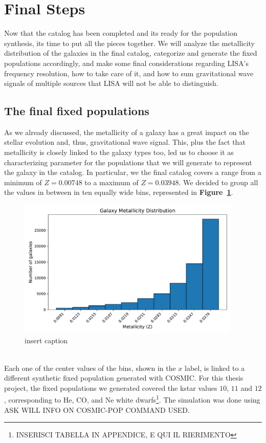 \section{Final Steps}
Now that the catalog has been completed and its ready for the population synthesis, its time to put all the pieces together.
We will analyze the metallicity distribution of the galaxies in the final catalog, categorize and generate the fixed populations accordingly, and make some final considerations regarding LISA's frequency resolution, how to take care of it, and how to sum gravitational wave signals of multiple sources that LISA will not be able to distinguish. 

\subsection{The final fixed populations}
As we already discussed, the metallicity of a galaxy has a great impact on the stellar evolution and, thus, gravitational wave signal.
This, plus the fact that metallicity is closely linked to the galaxy types too, led us to choose it as characterizing parameter for the populations that we will generate to represent the galaxy in the catalog.
In particular, we the final catalog covers a range from a minimum of $ Z= 0.00748$ to a maximum of $Z= 0.03948$.
We decided to group all the values in between in ten equally wide bins, represented in \textbf{Figure~\ref{fig: Z distribution of final catalog}}.
\begin{figure}[h!]
    \begin{center}
        \includegraphics[width=0.95\textwidth]{images/z_distro_gwgc_completed_ZOA.pdf}
    \end{center}
    \caption{insert caption}\label{fig: Z distribution of final catalog}
\end{figure}\\
Each one of the center values of the bins, shown in the $x$ label, is linked to a different synthetic fixed population generated with COSMIC.
For this thesis project, the fixed populations we generated covered the kstar values $10$, $11$ and $12$, corresponding to He, CO, and Ne white dwarfs\footnote{INSERISCI TABELLA IN APPENDICE, E QUI IL RIERIMENTO}.
The simulation was done using ASK WILL INFO ON COSMIC-POP COMMAND USED.

